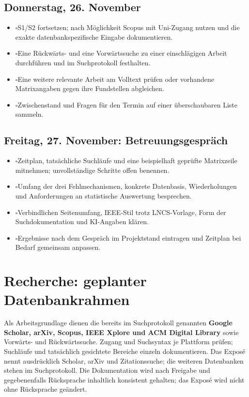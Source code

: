\documentclass[11pt,a4paper]{article}
\newcommand{\todoitem}{\(\square\)\enspace}
\begin{document}
\subsection*{Donnerstag, 26. November}
\begin{itemize}
  \item \todoitem S1/S2 fortsetzen; nach Möglichkeit Scopus mit Uni-Zugang
  nutzen und die exakte datenbankspezifische Eingabe dokumentieren.
  \item \todoitem Eine Rückwärts- und eine Vorwärtssuche zu einer
  einschlägigen Arbeit durchführen und im Suchprotokoll festhalten.
  \item \todoitem Eine weitere relevante Arbeit am Volltext prüfen oder
  vorhandene Matrixangaben gegen ihre Fundstellen abgleichen.
  \item \todoitem Zwischenstand und Fragen für den Termin auf einer
  überschaubaren Liste sammeln.
\end{itemize}

\subsection*{Freitag, 27. November: Betreuungsgespräch}
\begin{itemize}
  \item \todoitem Zeitplan, tatsächliche Suchläufe und eine beispielhaft
  geprüfte Matrixzeile mitnehmen; unvollständige Schritte offen benennen.
  \item \todoitem Umfang der drei Fehlmechanismen, konkrete Datenbasis,
  Wiederholungen und Anforderungen an statistische Auswertung besprechen.
  \item \todoitem Verbindlichen Seitenumfang, IEEE-Stil trotz LNCS-Vorlage,
  Form der Suchdokumentation und KI-Angaben klären.
  \item \todoitem Ergebnisse nach dem Gespräch im Projektstand eintragen und
  Zeitplan bei Bedarf gemeinsam anpassen.
\end{itemize}

\section{Recherche: geplanter Datenbankrahmen}

Als Arbeitsgrundlage dienen die bereits im Suchprotokoll genannten
\textbf{Google Scholar, arXiv, Scopus, IEEE Xplore und ACM Digital Library}
sowie Vorwärts- und Rückwärtssuche. Zugang und Suchsyntax je Plattform
prüfen; Suchläufe und tatsächlich gesichtete Bereiche einzeln dokumentieren.
Das Exposé nennt ausdrücklich Scholar, arXiv und Zitationssuche; die
weiteren Datenbanken stehen im Suchprotokoll. Die Dokumentation wird nach
Freigabe und gegebenenfalls Rücksprache inhaltlich konsistent gehalten;
das Exposé wird nicht ohne Rücksprache geändert.
\end{document}
